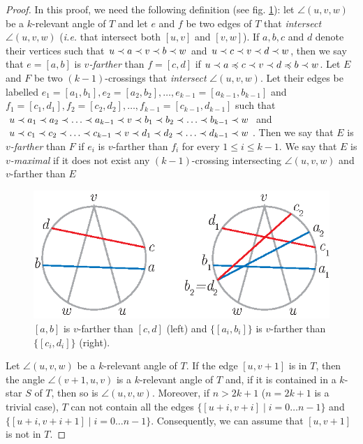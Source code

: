 \documentclass[12pt]{amsart}
\begin{document}
\begin{proof}
In this proof, we need the following definition (see fig. \ref{farther}): let $\angle(u,v,w)$ be a $k$-relevant angle of $T$ and let $e$ and $f$ be two edges of $T$ that \emph{intersect} $\angle(u,v,w)$ ({\it i.e.} that intersect both $[u,v]$ and $[v,w]$). If $a,b,c$ and $d$ denote their vertices such that $u\prec a\prec v\prec b\prec w$ and $u\prec c\prec v\prec d\prec w$, then we say that $e=[a,b]$ is \emph{$v$-farther} than $f=[c,d]$ if $u\prec a\preccurlyeq c\prec v\prec d\preccurlyeq b\prec w$. Let $E$ and $F$ be two $(k-1)$-crossings that \emph{intersect} $\angle(u,v,w)$. Let their edges be labelled $e_1=[a_1,b_1],e_2=[a_2,b_2],\ldots,e_{k-1}=[a_{k-1},b_{k-1}]$ and $f_1=[c_1,d_1],f_2=[c_2,d_2],\ldots,f_{k-1}=[c_{k-1},d_{k-1}]$ such that $u\prec a_1\prec a_2\prec \ldots\prec a_{k-1}\prec v\prec b_1\prec b_2\prec \ldots\prec b_{k-1}\prec w$ and $u\prec c_1\prec c_2\prec \ldots\prec c_{k-1}\prec v\prec d_1\prec d_2\prec \ldots\prec d_{k-1}\prec w$. Then we say that $E$ is \emph{$v$-farther} than $F$ if $e_i$ is $v$-farther than $f_i$ for every $1\le i\le k-1$. We say that $E$ is \emph{$v$-maximal} if it does not exist any $(k-1)$-crossing intersecting $\angle(u,v,w)$ and $v$-farther than $E$

\begin{figure}
\centerline{\includegraphics[scale=1]{farther.eps}}
\caption{\small{$[a,b]$ is $v$-farther than $[c,d]$ (left) and $\{[a_i,b_i]\}$ is $v$-farther than $\{[c_i,d_i]\}$ (right).}}\label{farther}
\end{figure}

Let $\angle(u,v,w)$ be a $k$-relevant angle of $T$. 
If the edge $[u,v+1]$ is in $T$, then the angle $\angle(v+1,u,v)$ is a $k$-relevant angle of $T$ and, if it is contained in a $k$-star $S$ of $T$, then so is $\angle(u,v,w)$. Moreover, if $n>2k+1$ ($n=2k+1$ is a trivial case), $T$ can not contain all the edges $\{[u+i,v+i]\;|\; i=0\ldots n-1\}$ and $\{[u+i,v+i+1]\;|\; i=0\ldots n-1\}$. Consequently, we can assume that $[u,v+1]$ is not in $T$.


\end{proof}
\end{document}
